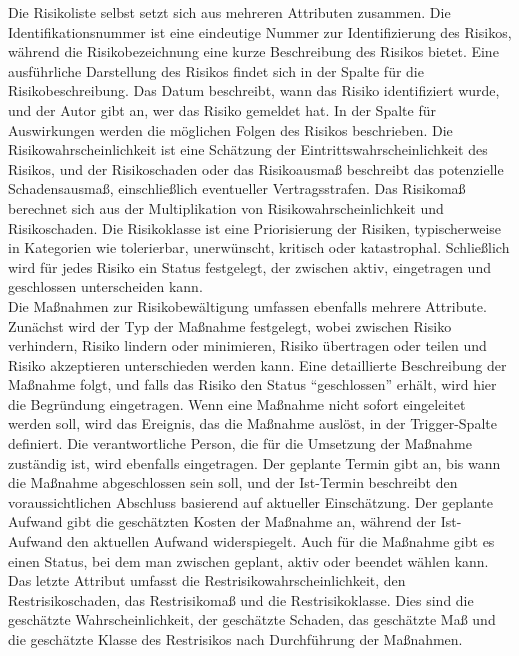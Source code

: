 Die Risikoliste selbst setzt sich aus mehreren Attributen zusammen. Die Identifikationsnummer ist eine eindeutige 
Nummer zur Identifizierung des Risikos, während die Risikobezeichnung eine kurze Beschreibung des Risikos bietet. 
Eine ausführliche Darstellung des Risikos findet sich in der Spalte für die Risikobeschreibung. Das Datum beschreibt, 
wann das Risiko identifiziert wurde, und der Autor gibt an, wer das Risiko gemeldet hat. In der Spalte für Auswirkungen 
werden die möglichen Folgen des Risikos beschrieben. Die Risikowahrscheinlichkeit ist eine Schätzung der 
Eintrittswahrscheinlichkeit des Risikos, und der Risikoschaden oder das Risikoausmaß beschreibt das potenzielle 
Schadensausmaß, einschließlich eventueller Vertragsstrafen. Das Risikomaß berechnet sich aus der Multiplikation von 
Risikowahrscheinlichkeit und Risikoschaden. Die Risikoklasse ist eine Priorisierung der Risiken, typischerweise in 
Kategorien wie tolerierbar, unerwünscht, kritisch oder katastrophal. Schließlich wird für jedes Risiko ein Status 
festgelegt, der zwischen aktiv, eingetragen und geschlossen unterscheiden kann.\\

Die Maßnahmen zur Risikobewältigung umfassen ebenfalls mehrere Attribute. Zunächst wird der Typ der Maßnahme festgelegt, 
wobei zwischen Risiko verhindern, Risiko lindern oder minimieren, Risiko übertragen oder teilen und Risiko akzeptieren 
unterschieden werden kann. Eine detaillierte Beschreibung der Maßnahme folgt, und falls das Risiko den Status 
``geschlossen'' erhält, wird hier die Begründung eingetragen. Wenn eine Maßnahme nicht sofort eingeleitet werden soll, 
wird das Ereignis, das die Maßnahme auslöst, in der Trigger-Spalte definiert. Die verantwortliche Person, die für 
die Umsetzung der Maßnahme zuständig ist, wird ebenfalls eingetragen. Der geplante Termin gibt an, bis wann die 
Maßnahme abgeschlossen sein soll, und der Ist-Termin beschreibt den voraussichtlichen Abschluss basierend auf 
aktueller Einschätzung. Der geplante Aufwand gibt die geschätzten Kosten der Maßnahme an, während der Ist-Aufwand 
den aktuellen Aufwand widerspiegelt. Auch für die Maßnahme gibt es einen Status, bei dem man zwischen geplant, aktiv 
oder beendet wählen kann. Das letzte Attribut umfasst die Restrisikowahrscheinlichkeit, den Restrisikoschaden, das 
Restrisikomaß und die Restrisikoklasse. Dies sind die geschätzte Wahrscheinlichkeit, der geschätzte Schaden, das 
geschätzte Maß und die geschätzte Klasse des Restrisikos nach Durchführung der Maßnahmen.

